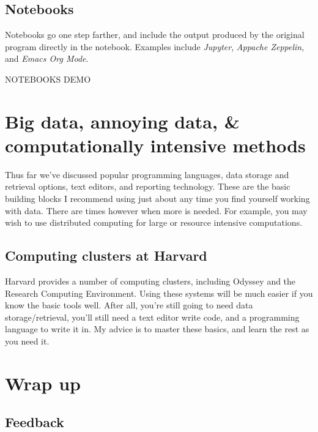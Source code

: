 \documentclass[
]{book}
\begin{document}
\hypertarget{notebooks}{%
\subsection{Notebooks}\label{notebooks}}

Notebooks go one step farther, and include the output produced by the original program directly in the notebook. Examples include \emph{Jupyter}, \emph{Appache Zeppelin}, and \emph{Emacs Org Mode}.

NOTEBOOKS DEMO

\hypertarget{big-data-annoying-data-computationally-intensive-methods}{%
\section{Big data, annoying data, \& computationally intensive methods}\label{big-data-annoying-data-computationally-intensive-methods}}

Thus far we've discussed popular programming languages, data storage and retrieval options, text editors, and reporting technology. These are the basic building blocks I recommend using just about any time you find yourself working with data. There are times however when more is needed. For example, you may wish to use distributed computing for large or resource intensive computations.

\hypertarget{computing-clusters-at-harvard}{%
\subsection{Computing clusters at Harvard}\label{computing-clusters-at-harvard}}

Harvard provides a number of computing clusters, including Odyssey and the Research Computing Environment. Using these systems will be much easier if you know the basic tools well. After all, you're still going to need data storage/retrieval, you'll still need a text editor write code, and a programming language to write it in. My advice is to master these basics, and learn the rest as you need it.

\hypertarget{wrap-up}{%
\section{Wrap up}\label{wrap-up}}

\hypertarget{feedback}{%
\subsection{Feedback}\label{feedback}}
\end{document}
